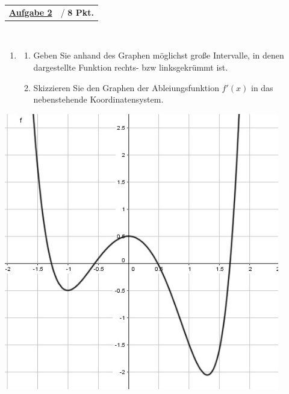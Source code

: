 \documentclass[oneside,openany,headings=optiontotoc,11pt,numbers=noenddot]{scrreprt}
\begin{document}
	\begin{framed}
		\begin{tabularx}{\textwidth}{Xl}\underline{\textbf{Aufgabe 2}}& / \textbf{8 Pkt.}\end{tabularx}\\
		\begin{minipage}{0.48\textwidth}
			\begin{enumerate}
				\item[]
				\begin{enumerate}
					\item Geben Sie anhand des Graphen möglichst große Intervalle, in denen dargestellte Funktion rechts- bzw linksgekrümmt ist.
					\item Skizzieren Sie den Graphen der Ableiungsfunktion \(f'(x)\) in das nebenstehende Koordinatensystem.
				\end{enumerate}
			\end{enumerate}
		\end{minipage}
		\hfill
		\begin{minipage}{0.48\textwidth}
			\includegraphics[width=0.9\textwidth]{../99_Bilder/20190519.jpg}
		\end{minipage}
	\end{framed}
\end{document}

